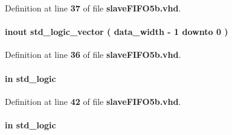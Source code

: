 Definition at line {\bf 37} of file {\bf slave\+F\+I\+F\+O5b.\+vhd}.

\paragraph[{fdata}]{ {\bfseries \textcolor{keywordflow}{inout}\textcolor{vhdlchar}{ }} {\bfseries \textcolor{comment}{std\+\_\+logic\+\_\+vector}\textcolor{vhdlchar}{ }\textcolor{vhdlchar}{(}\textcolor{vhdlchar}{ }\textcolor{vhdlchar}{ }\textcolor{vhdlchar}{ }\textcolor{vhdlchar}{ }{\bfseries {\bf data\+\_\+width}} \textcolor{vhdlchar}{-\/}\textcolor{vhdlchar}{ } \textcolor{vhdldigit}{1} \textcolor{vhdlchar}{ }\textcolor{keywordflow}{downto}\textcolor{vhdlchar}{ }\textcolor{vhdlchar}{ } \textcolor{vhdldigit}{0} \textcolor{vhdlchar}{ }\textcolor{vhdlchar}{)}\textcolor{vhdlchar}{ }} \hspace{0.3cm}{\ttfamily [Port]}}\label{classslaveFIFO5b_a3019e5940b8b703f7d054518c1db9fae}


Definition at line {\bf 36} of file {\bf slave\+F\+I\+F\+O5b.\+vhd}.

\paragraph[{flaga}]{ {\bfseries \textcolor{keywordflow}{in}\textcolor{vhdlchar}{ }} {\bfseries \textcolor{comment}{std\+\_\+logic}\textcolor{vhdlchar}{ }} \hspace{0.3cm}{\ttfamily [Port]}}\label{classslaveFIFO5b_ab49f0833b817d065aebf48ad634e99f6}


Definition at line {\bf 42} of file {\bf slave\+F\+I\+F\+O5b.\+vhd}.

\paragraph[{flagb}]{ {\bfseries \textcolor{keywordflow}{in}\textcolor{vhdlchar}{ }} {\bfseries \textcolor{comment}{std\+\_\+logic}\textcolor{vhdlchar}{ }} \hspace{0.3cm}{\ttfamily [Port]}}\label{classslaveFIFO5b_ab6e57a48da9205bd291e592df0a59f52}


